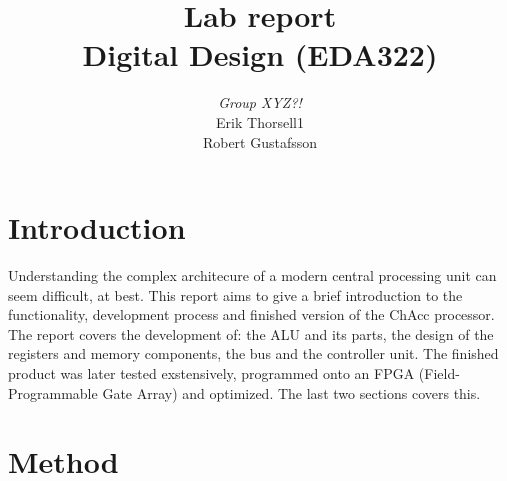 \documentclass[a4paper,11pt]{article}
\begin{document}
\begin{titlepage}

\title{\Huge{Lab report} \\[0.1cm] \Large{Digital Design (EDA322)}}
\author{\large{\emph{Group XYZ?!}} \\[0.2cm] Erik Thorsell1 \\[0.05cm] Robert Gustafsson \\[0.1cm]}
\maketitle
\thispagestyle{empty}
\end{titlepage}
\clearpage
\pagestyle{fancyplain}
\tableofcontents
\clearpage
{}
\setcounter{page}{1}

\section{Introduction}
Understanding the complex architecure of a modern central processing unit can 
seem difficult, at best. This report aims to give a brief introduction to 
the functionality, development process and finished version of the ChAcc 
processor. The report covers the development of: the ALU and its parts, 
the design of the registers and memory components, the bus and the controller 
unit. The finished product was later tested exstensively, programmed onto an 
FPGA (Field-Programmable Gate Array) and optimized. The last two sections 
covers this.

\section{Method}
\end{document}
